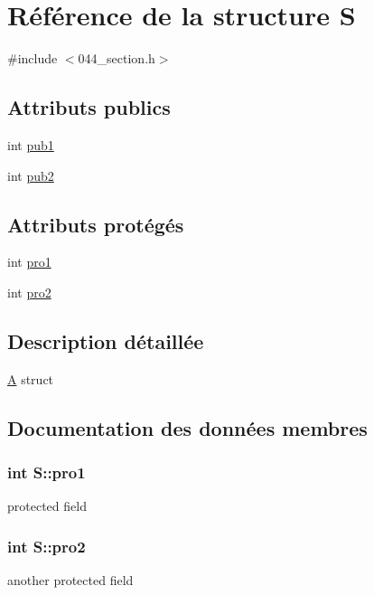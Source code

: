 \hypertarget{struct_s}{}\section{Référence de la structure S}
\label{struct_s}


{\ttfamily \#include $<$044\+\_\+section.\+h$>$}

\subsection*{Attributs publics}
\begin{DoxyCompactItemize}
\item 
int \hyperlink{struct_s_aff6062601582dff52ace76d285c2e504}{pub1}
\item 
int \hyperlink{struct_s_a413054db7785010db38c16322c8583cc}{pub2}
\end{DoxyCompactItemize}
\subsection*{Attributs protégés}
\begin{DoxyCompactItemize}
\item 
int \hyperlink{struct_s_ac506df106f05b04ac31b3b6ae1357067}{pro1}
\item 
int \hyperlink{struct_s_a0c535a6122f4ae509a336e3a67f927a4}{pro2}
\end{DoxyCompactItemize}


\subsection{Description détaillée}
\hyperlink{class_a}{A} struct 

\subsection{Documentation des données membres}
\hypertarget{struct_s_ac506df106f05b04ac31b3b6ae1357067}{}
\subsubsection[{pro1}]{\setlength{\rightskip}{0pt plus 5cm}int S\+::pro1\hspace{0.3cm}{\ttfamily [protected]}}\label{struct_s_ac506df106f05b04ac31b3b6ae1357067}
protected field \hypertarget{struct_s_a0c535a6122f4ae509a336e3a67f927a4}{}
\subsubsection[{pro2}]{\setlength{\rightskip}{0pt plus 5cm}int S\+::pro2\hspace{0.3cm}{\ttfamily [protected]}}\label{struct_s_a0c535a6122f4ae509a336e3a67f927a4}
another protected field \hypertarget{struct_s_aff6062601582dff52ace76d285c2e504}{}
